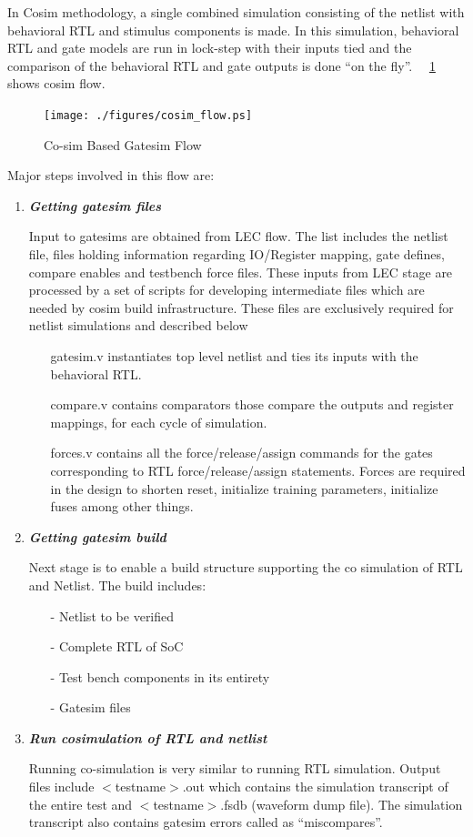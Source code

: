  In Cosim methodology, a single combined simulation consisting of the netlist with behavioral RTL and stimulus components is made. In this simulation, behavioral RTL and gate models are run in lock-step with their inputs tied and the comparison of the behavioral RTL and gate outputs is done ``on the fly''. ~\figurename{~\ref{fig:cosim_flow.ps}} shows cosim flow.




\begin{figure}[h]
\centering
\texttt{[image: ./figures/cosim\_flow.ps]}
\caption{Co-sim Based Gatesim Flow}
\label{fig:cosim_flow.ps}
\end{figure}

Major steps involved in this flow are:

\begin{enumerate}
	\item \emph{\bf Getting gatesim files}

	Input to gatesims are obtained from LEC flow. The list includes the netlist file, files holding information regarding IO/Register mapping, gate defines, compare enables and testbench force files. These inputs from LEC stage are processed by a set of scripts for developing intermediate files which are needed by cosim build infrastructure. These files are exclusively required for netlist simulations and described below
	\begin{itemize}
		\item[gatesim.v] instantiates top level netlist and ties its inputs with the behavioral RTL.
		\item[compare.v] contains comparators those compare the outputs and register mappings, for each cycle of simulation.
		\item[forces.v] contains all the force/release/assign commands for the gates corresponding to RTL force/release/assign statements. Forces are required in the design to shorten reset, initialize training parameters, initialize fuses among other things.
	\end{itemize}

	\item \emph{\bf Getting gatesim build} 

	Next stage is to enable a build structure supporting the co simulation of RTL and Netlist. The build includes:
	\begin{itemize}
		\item[-]Netlist to be verified
		\item[-]Complete RTL of SoC
		\item[-]Test bench components in its entirety
		\item[-]Gatesim files
	\end{itemize}

	\item \emph{\bf Run cosimulation of RTL and netlist}

	Running co-simulation is very similar to running RTL simulation. Output files include $<$testname$>$.out which contains the simulation transcript of the entire test and $<$testname$>$.fsdb (waveform dump file). The simulation transcript also contains gatesim errors called as ``miscompares''.
\end{enumerate}


